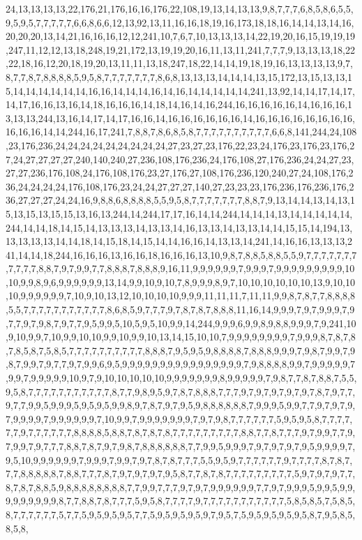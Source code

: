 24,13,13,13,13,22,176,21,176,16,16,176,22,108,19,13,14,13,13,9,8,7,7,7,6,8,5,8,6,5,5,9,5,9,5,7,7,7,7,7,6,6,8,6,6,12,13,92,13,11,16,16,18,19,16,173,18,18,16,14,14,13,14,16,20,20,20,13,14,21,16,16,16,12,12,241,10,7,6,7,10,13,13,13,14,22,19,20,16,15,19,19,19,247,11,12,12,13,18,248,19,21,172,13,19,19,20,16,11,13,11,241,7,7,7,9,13,13,13,18,22,22,18,16,12,20,18,19,20,13,11,11,13,18,247,18,22,14,14,19,18,19,16,13,13,13,13,9,7,8,7,7,8,7,8,8,8,8,5,9,5,8,7,7,7,7,7,7,7,8,6,8,13,13,13,14,14,14,13,15,172,13,15,13,13,15,14,14,14,14,14,14,16,16,14,14,14,16,14,16,14,14,14,14,14,241,13,92,14,14,17,14,17,14,17,16,16,13,16,14,18,16,16,16,14,18,14,16,14,16,244,16,16,16,16,16,14,16,16,16,13,13,13,244,13,16,14,17,14,17,16,16,14,16,16,16,16,16,16,14,16,16,16,16,16,16,16,16,16,16,16,14,14,244,16,17,241,7,8,8,7,8,6,8,5,8,7,7,7,7,7,7,7,7,7,7,6,6,8,141,244,24,108,23,176,236,24,24,24,24,24,24,24,24,24,27,23,27,23,176,22,23,24,176,23,176,23,176,27,24,27,27,27,27,240,140,240,27,236,108,176,236,24,176,108,27,176,236,24,24,27,23,27,27,236,176,108,24,176,108,176,23,27,176,27,108,176,236,120,240,27,24,108,176,236,24,24,24,24,176,108,176,23,24,24,27,27,27,140,27,23,23,23,176,236,176,236,176,236,27,27,27,24,24,16,9,8,8,6,8,8,8,8,5,5,9,5,8,7,7,7,7,7,7,7,8,8,7,9,13,14,14,13,14,13,15,13,15,13,15,15,13,16,13,244,14,244,17,17,16,14,14,244,14,14,14,13,14,14,14,14,14,244,14,14,18,14,15,14,13,13,13,14,13,13,14,16,13,13,14,13,13,14,14,15,15,14,194,13,13,13,13,13,14,14,18,14,15,18,14,15,14,14,16,16,14,13,13,14,241,14,16,16,13,13,13,241,14,14,18,244,16,16,16,13,16,16,18,16,16,16,13,10,9,8,7,8,8,5,8,8,5,5,9,7,7,7,7,7,7,7,7,7,7,7,8,8,7,9,7,9,9,7,7,8,8,8,7,8,8,8,9,16,11,9,9,9,9,9,9,7,9,9,9,7,9,9,9,9,9,9,9,9,9,10,10,9,9,8,9,6,9,9,9,9,9,9,13,14,9,9,10,9,10,7,8,9,9,9,8,9,7,10,10,10,10,10,10,13,9,10,10,10,9,9,9,9,9,9,7,10,9,10,13,12,10,10,10,10,9,9,9,11,11,11,7,11,11,9,9,8,7,8,7,7,8,8,8,8,5,5,7,7,7,7,7,7,7,7,7,7,7,8,6,8,5,9,7,7,7,9,7,8,7,8,7,8,8,8,11,16,14,9,9,9,7,9,7,9,9,9,7,9,7,7,9,7,9,8,7,9,7,7,9,5,9,9,5,10,5,9,5,10,9,9,14,244,9,9,9,6,9,9,8,9,8,8,9,9,9,7,9,241,10,9,10,9,9,7,10,9,9,10,10,9,9,10,9,9,10,13,14,15,10,10,7,9,9,9,9,9,9,9,9,7,9,9,9,8,7,8,7,8,7,8,5,8,7,5,8,5,7,7,7,7,7,7,7,7,7,7,8,8,8,7,9,5,9,5,9,8,8,8,8,7,8,8,8,9,9,9,7,9,8,7,9,9,7,9,8,7,9,9,7,9,7,7,9,7,9,9,6,9,5,9,9,9,9,9,9,9,9,9,9,9,9,9,9,9,9,7,9,8,8,8,8,9,9,7,9,9,9,9,9,7,9,9,7,9,9,9,9,9,10,9,7,9,10,10,10,10,10,9,9,9,9,9,9,9,8,9,9,9,9,9,7,9,8,7,7,8,7,8,8,7,5,5,9,5,8,7,7,7,7,7,7,7,7,7,7,7,8,7,7,9,8,9,5,9,7,8,7,8,8,8,7,7,7,9,7,9,7,9,7,9,7,9,7,8,7,9,7,7,9,7,7,9,9,5,9,9,9,5,9,5,9,5,9,9,8,9,7,8,7,9,7,9,5,9,8,8,8,8,8,8,7,9,9,9,5,9,9,7,7,9,7,9,7,9,7,9,9,9,9,7,9,9,9,9,9,9,7,10,9,9,7,9,9,9,9,9,9,9,7,9,7,9,8,7,7,7,7,7,7,5,9,5,9,5,8,7,7,7,7,7,7,9,7,7,7,7,7,7,8,8,8,8,5,8,8,7,8,7,8,7,8,7,7,7,7,7,7,7,7,7,8,8,7,7,8,7,7,7,9,7,9,9,7,7,9,7,9,9,7,9,7,7,7,8,8,7,8,7,9,7,9,8,7,8,8,8,8,8,8,7,7,9,9,5,9,9,9,7,9,7,9,7,9,7,9,5,9,9,9,9,7,9,5,10,9,9,9,9,9,9,7,9,9,9,7,9,9,7,9,7,8,7,8,7,7,7,5,5,9,5,9,7,7,7,7,7,7,9,7,7,7,7,8,7,8,7,7,7,8,8,8,8,8,7,8,8,7,7,7,8,7,9,7,9,7,9,7,9,5,8,7,7,8,7,8,7,7,7,7,7,7,7,7,7,5,9,7,9,7,9,7,7,8,7,8,7,8,8,5,9,8,8,8,8,8,8,8,8,7,7,9,9,7,7,7,9,7,9,7,9,9,9,9,9,9,7,7,9,7,9,9,9,5,9,9,5,9,9,9,9,9,9,9,9,9,8,7,7,8,8,7,8,7,7,7,5,9,5,8,7,7,7,7,9,7,7,7,7,7,7,7,7,7,7,7,5,8,5,8,5,7,5,8,5,8,7,7,7,7,7,7,5,7,7,5,9,5,9,5,9,5,7,7,5,9,5,9,5,9,5,9,7,9,5,7,5,9,5,9,5,9,5,9,5,8,7,9,5,8,5,8,5,8,